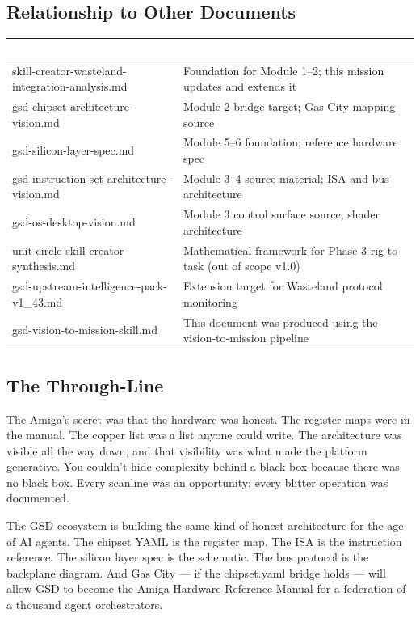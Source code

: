 \documentclass[11pt,letterpaper]{article}
\newcommand{\tableheader}[1]{\textbf{\sffamily\textcolor{white}{#1}}}
\begin{document}
\subsection{Relationship to Other Documents}

\begin{center}
\begin{tabularx}{\textwidth}{L{5cm}X}
\toprule
{}
\tableheader{Document} & \tableheader{Relationship} \\
\midrule
skill-creator-wasteland-integration-analysis.md & Foundation for Module 1--2; this mission updates and extends it \\
gsd-chipset-architecture-vision.md & Module 2 bridge target; Gas City mapping source \\
gsd-silicon-layer-spec.md & Module 5--6 foundation; reference hardware spec \\
gsd-instruction-set-architecture-vision.md & Module 3--4 source material; ISA and bus architecture \\
gsd-os-desktop-vision.md & Module 3 control surface source; shader architecture \\
unit-circle-skill-creator-synthesis.md & Mathematical framework for Phase 3 rig-to-task (out of scope v1.0) \\
gsd-upstream-intelligence-pack-v1\_43.md & Extension target for Wasteland protocol monitoring \\
gsd-vision-to-mission-skill.md & This document was produced using the vision-to-mission pipeline \\
\bottomrule
\end{tabularx}
\end{center}

\subsection{The Through-Line}

The Amiga's secret was that the hardware was honest. The register maps were in the manual. The copper list was a list anyone could write. The architecture was visible all the way down, and that visibility was what made the platform generative. You couldn't hide complexity behind a black box because there was no black box. Every scanline was an opportunity; every blitter operation was documented.

The GSD ecosystem is building the same kind of honest architecture for the age of AI agents. The chipset YAML is the register map. The ISA is the instruction reference. The silicon layer spec is the schematic. The bus protocol is the backplane diagram. And Gas City --- if the chipset.yaml bridge holds --- will allow GSD to become the Amiga Hardware Reference Manual for a federation of a thousand agent orchestrators.
\end{document}
